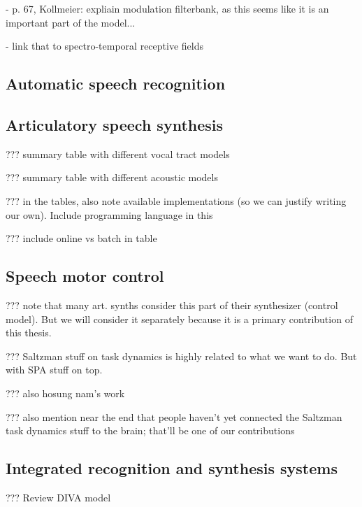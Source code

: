 - p. 67, Kollmeier: expliain modulation filterbank,
  as this seems like it is an important part of the model...

- link that to spectro-temporal receptive fields

\subsection{Automatic speech recognition}

\subsection{Articulatory speech synthesis}

??? summary table with different vocal tract models

??? summary table with different acoustic models

??? in the tables, also note available implementations
(so we can justify writing our own).
Include programming language in this

??? include online vs batch in table

\subsection{Speech motor control}

??? note that many art. synths consider this part of their
synthesizer (control model).
But we will consider it separately because
it is a primary contribution of this thesis.

??? Saltzman stuff on task dynamics
is highly related to what we want to do.
But with SPA stuff on top.

??? also hosung nam's work

??? also mention near the end that people haven't
yet connected the Saltzman task dynamics stuff
to the brain; that'll be one of our contributions

\subsection{Integrated recognition and synthesis systems}

??? Review DIVA model


